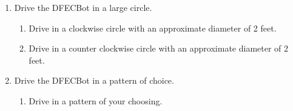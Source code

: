 \documentclass{handout}
\begin{document}
\begin{enumerate}
\begin{enumerate}
		\end{enumerate}
		\item Drive the DFECBot in a large circle.
		\begin{enumerate}
			\item Drive in a clockwise circle with an approximate diameter of 2 feet.
			\item Drive in a counter clockwise circle with an approximate diameter of 2 feet.
		\end{enumerate}
		\item Drive the DFECBot in a pattern of choice.
		\begin{enumerate}
			\item Drive in a pattern of your choosing.
		\end{enumerate} 
	

\end{enumerate}


	
\end{document}
